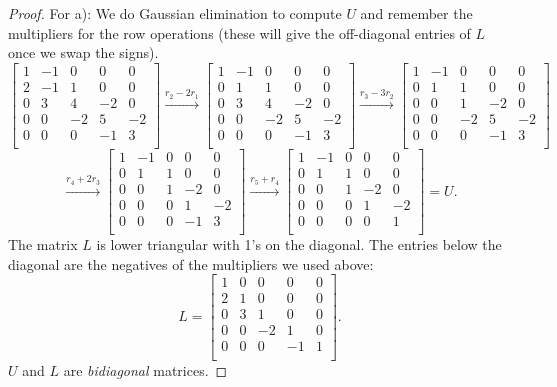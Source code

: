 \documentclass{article}
\theoremstyle{definition}
\begin{document}
\begin{proof}
For a): We do Gaussian elimination to compute $U$ and remember the multipliers for the row operations (these will give the off-diagonal entries of $L$ once we swap the signs).
	\[\begin{bmatrix}
		1 & -1& 0&0&0\\
		2&-1&1&0&0\\
		0&3&4&-2&0\\
		0&0&-2&5&-2\\
		0&0&0&-1&3\\
	\end{bmatrix} \xrightarrow{r_2-2r_1}
\begin{bmatrix}
	1 & -1& 0&0&0\\
	0&1&1&0&0\\
	0&3&4&-2&0\\
	0&0&-2&5&-2\\
	0&0&0&-1&3\\
\end{bmatrix} \xrightarrow{r_3-3r_2}
\begin{bmatrix}
1 & -1& 0&0&0\\
0&1&1&0&0\\
0&0&1&-2&0\\
0&0&-2&5&-2\\
0&0&0&-1&3\\
\end{bmatrix} \]\[\xrightarrow{r_4+2r_3}
\begin{bmatrix}
1 & -1& 0&0&0\\
0&1&1&0&0\\
0&0&1&-2&0\\
0&0&0&1&-2\\
0&0&0&-1&3\\
\end{bmatrix}\xrightarrow{r_5+r_4}
\begin{bmatrix}
1 & -1& 0&0&0\\
0&1&1&0&0\\
0&0&1&-2&0\\
0&0&0&1&-2\\
0&0&0&0&1\\
\end{bmatrix}=U.\]
The matrix $L$ is lower triangular with 1's on the diagonal. The entries below the diagonal are the negatives of the multipliers we used above:
\[
L=\begin{bmatrix}
	1 & 0& 0&0&0\\
	2&1&0&0&0\\
	0&3&1&0&0\\
	0&0&-2&1&0\\
	0&0&0&-1&1\\
\end{bmatrix}.\]
$U$ and $L$ are \emph{bidiagonal} matrices.


\end{proof}
\end{document}
